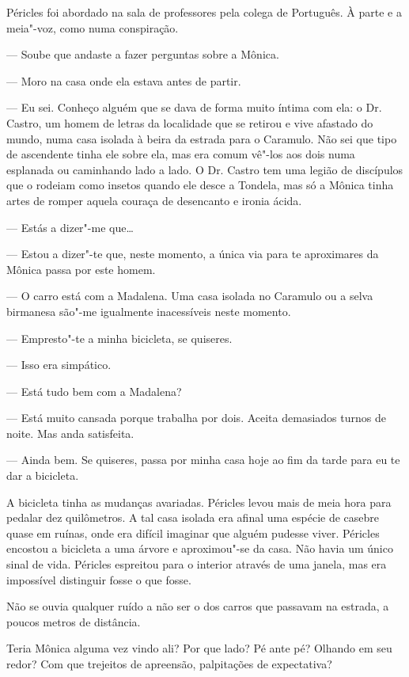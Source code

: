 Péricles foi abordado na sala de professores pela colega de Português. À
parte e a meia"-voz, como numa conspiração.

--- Soube que andaste a fazer perguntas sobre a Mônica.

--- Moro na casa onde ela estava antes de partir.

--- Eu sei. Conheço alguém que se dava de forma muito íntima com ela: o
  Dr. Castro, um homem de letras da localidade que se retirou e vive
  afastado do mundo, numa casa isolada à beira da estrada para o
  Caramulo. Não sei que tipo de ascendente tinha ele sobre ela, mas era
  comum vê"-los aos dois numa esplanada ou caminhando lado a lado. O Dr.
  Castro tem uma legião de discípulos que o rodeiam como insetos
  quando ele desce a Tondela, mas só a Mônica tinha artes de romper
  aquela couraça de desencanto e ironia ácida.

--- Estás a dizer"-me que\ldots{}

--- Estou a dizer"-te que, neste momento, a única via para te aproximares
  da Mônica passa por este homem.

--- O carro está com a Madalena. Uma casa isolada no Caramulo ou a selva
  birmanesa são"-me igualmente inacessíveis neste momento.

--- Empresto"-te a minha bicicleta, se quiseres.

--- Isso era simpático.

--- Está tudo bem com a Madalena?


--- Está muito cansada porque trabalha por dois. Aceita demasiados turnos
  de noite. Mas anda satisfeita.

--- Ainda bem. Se quiseres, passa por minha casa hoje ao fim da tarde para
  eu te dar a bicicleta.


A bicicleta tinha as mudanças avariadas. Péricles levou mais de meia
hora para pedalar dez quilômetros. A tal casa isolada era afinal uma
espécie de casebre quase em ruínas, onde era difícil imaginar que alguém
pudesse viver. Péricles encostou a bicicleta a uma árvore e aproximou"-se
da casa. Não havia um único sinal de vida. Péricles espreitou para o
interior através de uma janela, mas era impossível distinguir fosse o
que fosse.

Não se ouvia qualquer ruído a não ser o dos carros que passavam na
estrada, a poucos metros de distância.

Teria Mônica alguma vez vindo ali? Por que lado? Pé ante pé? Olhando em
seu redor? Com que trejeitos de apreensão, palpitações de expectativa?

